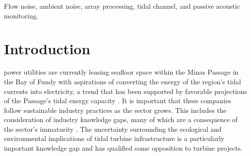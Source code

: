\documentclass[12pt,journal,onecolumn]{IEEEtran}
\begin{document}
\begin{IEEEkeywords}
Flow noise, ambient noise, array processing, tidal channel, and passive acoustic monitoring.
\end{IEEEkeywords}






%
\IEEEpeerreviewmaketitle



\section{Introduction}
\label{I}
% 
% 
% 
% 
 power utilities are currently leasing seafloor space within the Minas Passage in the Bay of Fundy with aspirations of converting the energy of the region's tidal currents into electricity, a trend that has been supported by favorable projections of the Passage's tidal energy capacity \cite{karsten}. It is important that these companies follow sustainable industry practices as the sector grows. This includes the consideration of industry knowledge gaps, many of which are a consequence of the sector's immaturity \cite{inger}. The uncertainty surrounding the ecological and environmental implications of tidal turbine infrastructure is a particularly important knowledge gap and has qualified some opposition to turbine projects. 
\end{document}
